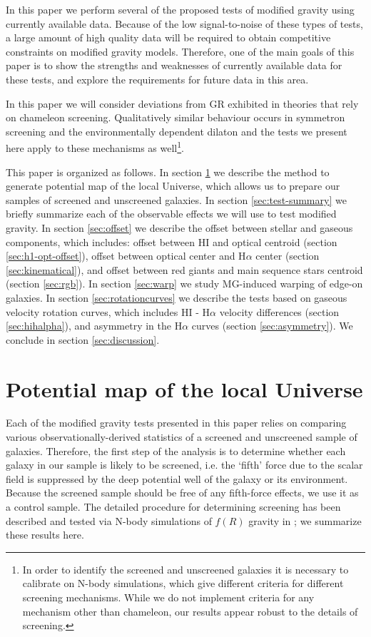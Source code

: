 \documentclass[useAMS,usenatbib,twocolumn]{mn2e}
\newcommand{\ha}{H$\alpha$}
\begin{document}
In this paper we perform several of the proposed tests of modified gravity
using currently available data. Because of the low signal-to-noise of these
types of tests, a large amount of high quality data will be required to
obtain competitive constraints on modified gravity models.
Therefore, one of the main goals of this paper is to show the strengths and
weaknesses of currently available data for these tests, and explore the
requirements for future data in this area.

In this paper we will consider deviations from GR exhibited in
theories that rely on chameleon screening.
Qualitatively similar behaviour occurs in symmetron screening
\citep{hinterbichler10} and the environmentally dependent
dilaton \citep{brax10} and the tests we  present here apply
to these mechanisms as well\footnote{In order to identify the screened and
  unscreened galaxies it is necessary to calibrate on N-body simulations,
  which give different criteria for different screening mechanisms. While
  we do not implement criteria for any mechanism other than chameleon,  
  our results appear robust to the details of screening.}. 

This paper is organized as follows. In section \ref{pot-sec} we describe the
method to generate potential map of the local Universe, which allows us to
prepare our samples of screened and unscreened galaxies.
In section  \ref{sec:test-summary} we briefly summarize each of the observable
effects we will use to test modified gravity.
In section \ref{sec:offset} we describe the offset between stellar
and gaseous components, which includes:
offset between HI and optical centroid (section \ref{sec:h1-opt-offset}), 
offset between optical center and \ha{} center (section \ref{sec:kinematical}), 
and offset between red giants and main sequence stars centroid (section
\ref{sec:rgb}).
In section \ref{sec:warp} we study MG-induced warping of edge-on galaxies.
In section \ref{sec:rotationcurves} we describe the tests based on
 gaseous velocity rotation curves, which includes
HI - \ha{} velocity differences (section \ref{sec:hihalpha}), and
asymmetry in the \ha{} curves (section \ref{sec:asymmetry}).
We conclude in section \ref{sec:discussion}.

\section{Potential map of the local Universe}
\label{pot-sec}
Each of the modified gravity tests presented in this paper relies on comparing
various observationally-derived statistics of a screened and unscreened sample
of galaxies.
Therefore, the first step of the analysis is to determine whether each
galaxy in our sample is likely to be screened, i.e. the `fifth' force due
to the  scalar field is suppressed by the deep 
potential well of the galaxy or its environment.  
Because the screened sample should be free of any fifth-force effects, we use
it as a control sample.  The detailed procedure for 
determining screening has been described and tested via N-body simulations
of $f(R)$ gravity in \cite{cabre2012}; we summarize these results here.
\end{document}

